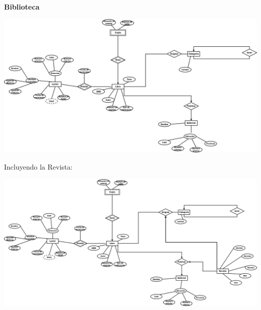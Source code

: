\textbf{Biblioteca}

\begin{center}
    \includegraphics[width=16cm]{resources/3.a_Biblio.drawio.png}
\end{center}

Incluyendo la Revista:

\begin{center}
    \includegraphics[width=16cm]{resources/3.a_BiblioRevista.drawio.png}
\end{center}

